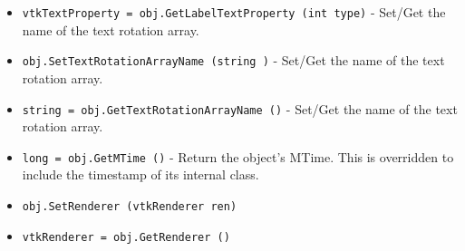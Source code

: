 \begin{itemize}
\item  \verb|vtkTextProperty = obj.GetLabelTextProperty (int type)| -  Set/Get the name of the text rotation array.

\item  \verb|obj.SetTextRotationArrayName (string )| -  Set/Get the name of the text rotation array.

\item  \verb|string = obj.GetTextRotationArrayName ()| -  Set/Get the name of the text rotation array.

\item  \verb|long = obj.GetMTime ()| -  Return the object's MTime. This is overridden to include 
 the timestamp of its internal class.

\item  \verb|obj.SetRenderer (vtkRenderer ren)|

\item  \verb|vtkRenderer = obj.GetRenderer ()|

\end{itemize}
